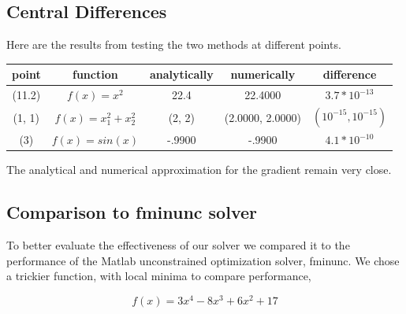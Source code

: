 \documentclass{article}
\begin{document}
\subsection*{ Central Differences}
Here are the results from testing the two methods at different points.

\begin{center}
  \begin{tabular}{ | c | c | c | c | c | }
    \hline
     point & function & analytically & numerically & difference \\ \hline
     (11.2) & $f(x) = x^2$ & 22.4 & 22.4000 & $3.7*10^{-13}$ \\ \hline
     (1, 1) & $f(x) = x_1^2+ x_2^2$ & (2, 2) & (2.0000, 2.0000) & $(10^{-15}, 10^{-15})$ \\ \hline
     (3) & $f(x) = sin(x)$ & -.9900 & -.9900 & $4.1*10^{-10}$ \\ 
    \hline
  \end{tabular}
\end{center}

The analytical and numerical approximation for the gradient remain very close.

\subsection*{Comparison to fminunc solver}

To better evaluate the effectiveness of our solver we compared it to the performance of the Matlab unconstrained optimization solver, fminunc. We chose a trickier function, with local minima to compare performance, 

\begin{equation}
f(x)= 3x^4-8x^3+6x^2+17
\end{equation}
\end{document}
